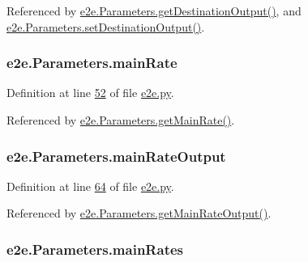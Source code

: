 Referenced by \hyperlink{e2e_8py_source_l00096}{e2e.\+Parameters.\+get\+Destination\+Output()}, and \hyperlink{e2e_8py_source_l00093}{e2e.\+Parameters.\+set\+Destination\+Output()}.

\subsubsection[{\texorpdfstring{main\+Rate}{mainRate}}]{\setlength{\rightskip}{0pt plus 5cm}e2e.\+Parameters.\+main\+Rate}\hypertarget{classe2e_1_1_parameters_a3d473f94dbb62a1488945cf6abc9f108}{}\label{classe2e_1_1_parameters_a3d473f94dbb62a1488945cf6abc9f108}


Definition at line \hyperlink{e2e_8py_source_l00052}{52} of file \hyperlink{e2e_8py_source}{e2e.\+py}.



Referenced by \hyperlink{e2e_8py_source_l00054}{e2e.\+Parameters.\+get\+Main\+Rate()}.

\subsubsection[{\texorpdfstring{main\+Rate\+Output}{mainRateOutput}}]{\setlength{\rightskip}{0pt plus 5cm}e2e.\+Parameters.\+main\+Rate\+Output}\hypertarget{classe2e_1_1_parameters_acff858a94aecf1e5a553273e8acd9eca}{}\label{classe2e_1_1_parameters_acff858a94aecf1e5a553273e8acd9eca}


Definition at line \hyperlink{e2e_8py_source_l00064}{64} of file \hyperlink{e2e_8py_source}{e2e.\+py}.



Referenced by \hyperlink{e2e_8py_source_l00066}{e2e.\+Parameters.\+get\+Main\+Rate\+Output()}.

\subsubsection[{\texorpdfstring{main\+Rates}{mainRates}}]{\setlength{\rightskip}{0pt plus 5cm}e2e.\+Parameters.\+main\+Rates}\hypertarget{classe2e_1_1_parameters_aaa2b41d7017ab4893bbe27fa8edb7180}{}\label{classe2e_1_1_parameters_aaa2b41d7017ab4893bbe27fa8edb7180}


